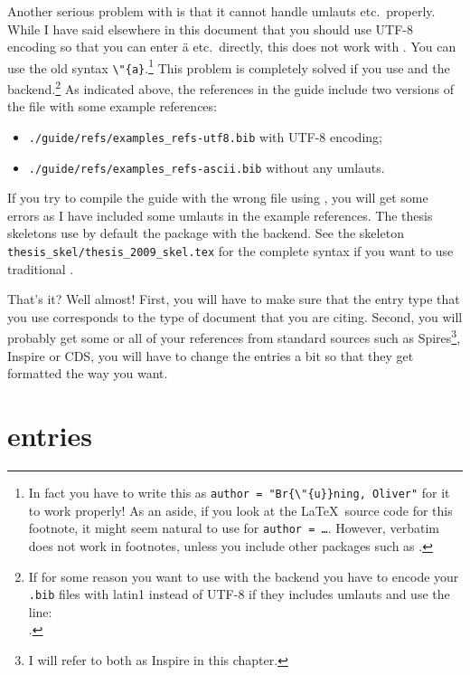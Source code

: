 Another serious problem with \BibTeX{} is that it cannot handle
umlauts etc.\ properly. While I have said elsewhere in this document
that you should use UTF-8 encoding so that you can enter ä
etc.\ directly, this does not work with \BibTeX. You can use the
old syntax \verb+\"{a}+.\footnote{%
  In fact you have to write this as \texttt{author = "Br\{\textbackslash"\{u\}\}ning, Oliver"} for it to work properly! %
  As an aside, if you look at the \LaTeX\ source code for this footnote,
  it might seem natural to use  for \texttt{author = \dots}.
  However, verbatim does not work in footnotes,
  unless you include other packages such as .}
This problem is completely solved if you use
 and the  backend.\footnote{%
If for some reason you want to use  with the  backend
you have to encode your \texttt{.bib}
files with latin1 instead of UTF-8 if they includes umlauts and use the line:\\
.}
As indicated above, the references in the guide include two versions of the file with some example references:
\begin{itemize}
\setlength{\parskip}{0pt}\setlength{\itemsep}{0pt}
\item \texttt{./guide/refs/examples\_refs-utf8.bib} with UTF-8 encoding;
\item \texttt{./guide/refs/examples\_refs-ascii.bib} without any umlauts.
\end{itemize}
If you try to compile the guide with the wrong file using \BibTeX, you
will get some errors as I have included some umlauts in the example
references.
The thesis skeletons use by default the package  with the  backend.
See the skeleton \texttt{thesis\_skel/thesis\_2009\_skel.tex} for the complete syntax
if you want to use traditional \BibTeX.

That's it? Well almost! First, you will have to make sure that the
entry type that you use corresponds to the type of document that you
are citing. Second, you will probably get some or all of your
references from standard sources such as Spires\footnote{I
  will refer to both as Inspire in this chapter.}, Inspire or CDS, you will have
to change the entries a bit so that they get formatted the way you want.


\section{\BibTeX{} entries}%
\label{sec:ref:bib}

